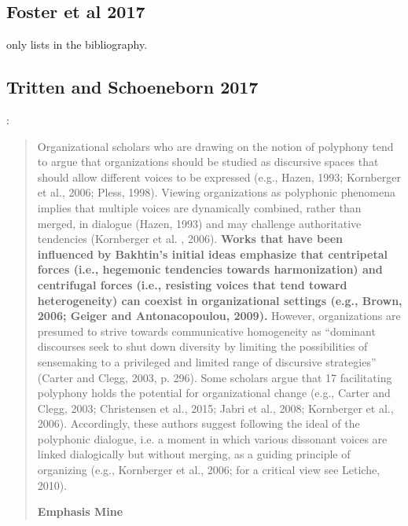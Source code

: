 \subsection{Foster et al 2017}
\cite{foster2017strategic} only lists \cite{geiger2009narratives} in the bibliography.

\subsection{Tritten and Schoeneborn 2017}

\cite{trittin2017diversity}:
\begin{quote}
Organizational  scholars who are  drawing  on  the  notion  of  polyphony  tend  to  argue  that organizations  should  be  studied  as  discursive  spaces  that  should allow different  voices  to  be expressed (e.g., Hazen,  1993; Kornberger et al.,  2006; Pless,  1998). Viewing organizations as polyphonic phenomena implies  that  multiple  voices  are  dynamically  combined,  rather  than  merged,  in dialogue (Hazen, 1993) and may challenge authoritative tendencies (Kornberger et al.   ,   2006).   {\bf Works  that  have  been  influenced  by  Bakhtin’s  initial  ideas  emphasize  that  centripetal  forces  (i.e.,  hegemonic  tendencies  towards  harmonization)  and  centrifugal  forces  (i.e.,  resisting  voices  that  tend  toward  heterogeneity)  can  coexist  in  organizational  settings  (e.g.,   Brown,   2006;   Geiger   and   Antonacopoulou,   2009).}   However,   organizations   are   presumed to strive towards communicative homogeneity as “dominant discourses seek to shut down diversity by limiting the possibilities of sensemaking to a privileged and limited range of  discursive  strategies”  (Carter  and  Clegg,  2003,  p.  296).  Some scholars argue  that  17 
facilitating  polyphony  holds  the  potential  for  organizational  change (e.g.,  Carter  and  Clegg,  2003; Christensen et al., 2015; Jabri et al., 2008; Kornberger et al., 2006). Accordingly, these authors  suggest  following  the  ideal  of  the polyphonic  dialogue,   i.e.  a  moment  in  which  various dissonant voices are linked dialogically but without merging, as a guiding principle of organizing (e.g., Kornberger et al., 2006; for a critical view see Letiche, 2010). 
\begin{flushright}
{\bf Emphasis Mine}
\end{flushright}
\end{quote}

